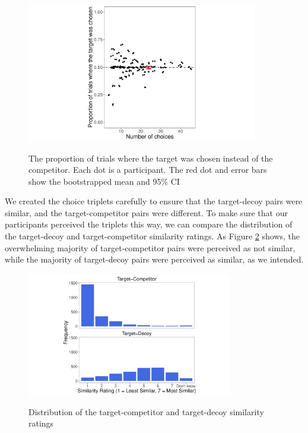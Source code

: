 \documentclass[12pt, a4paper]{article}
\begin{document}
\begin{figure}[htb!]
\centering
\captionsetup{justification=centering}
\caption{The proportion of trials where the target was chosen instead of the competitor. Each dot is a participant. The red dot and error bars show the bootstrapped mean and 95\% CI}
\includegraphics[width=0.9\textwidth]{figure4.pdf}
\label{fig:exp2_res}
\end{figure}

We created the choice triplets carefully to ensure that the target-decoy pairs were similar, and the target-competitor pairs were different. To make sure that our participants perceived the triplets this way, we can compare the distribution of the target-decoy and target-competitor similarity ratings. As Figure \ref{fig:exp2_similarityratings} shows, the overwhelming majority of target-competitor pairs were perceived as not similar, while the majority of target-decoy pairs were perceived as similar, as we intended.

\begin{figure}[htb!]
\centering
\captionsetup{justification=centering}
		\caption{Distribution of the target-competitor and target-decoy similarity ratings}
\includegraphics[width=0.8\textwidth]{figure5.pdf}
\label{fig:exp2_similarityratings}
\end{figure}
\end{document}
